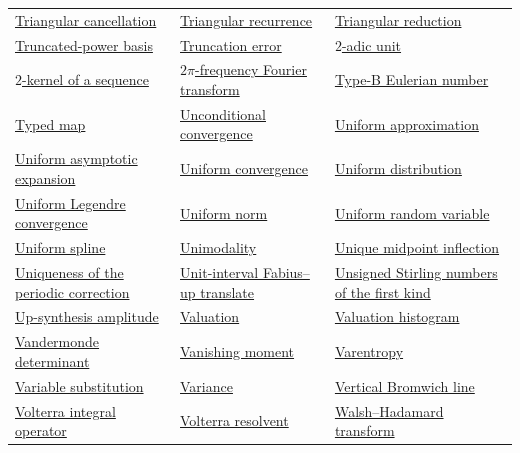 \documentclass[11pt,oneside]{article}
\begin{document}
\begin{longtable}{L{0.31\textwidth}L{0.31\textwidth}L{0.31\textwidth}}
\hyperlink{gls:triangular-cancellation}{Triangular cancellation} & \hyperlink{gls:triangular-recurrence}{Triangular recurrence} & \hyperlink{gls:triangular-reduction}{Triangular reduction} \\
\hyperlink{gls:truncated-power-basis}{Truncated-power basis} & \hyperlink{gls:truncation-error}{Truncation error} & \hyperlink{gls:two-adic-unit}{\(2\)-adic unit} \\
\hyperlink{gls:two-kernel}{\(2\)-kernel of a sequence} & \hyperlink{gls:two-pi-fourier-transform}{\(2\pi\)-frequency Fourier transform} & \hyperlink{gls:type-b-eulerian-number}{Type-B Eulerian number} \\
\hyperlink{gls:typed-map}{Typed map} & \hyperlink{gls:unconditional-convergence}{Unconditional convergence} & \hyperlink{gls:uniform-approximation}{Uniform approximation} \\
\hyperlink{gls:uniform-asymptotic-expansion}{Uniform asymptotic expansion} & \hyperlink{gls:uniform-convergence}{Uniform convergence} & \hyperlink{gls:uniform-distribution}{Uniform distribution} \\
\hyperlink{gls:uniform-legendre-convergence}{Uniform Legendre convergence} & \hyperlink{gls:uniform-norm}{Uniform norm} & \hyperlink{gls:uniform-random-variable}{Uniform random variable} \\
\hyperlink{gls:uniform-spline}{Uniform spline} & \hyperlink{gls:unimodality}{Unimodality} & \hyperlink{gls:unique-midpoint-inflection}{Unique midpoint inflection} \\
\hyperlink{gls:uniqueness-of-periodic-correction}{Uniqueness of the periodic correction} & \hyperlink{gls:fabius-translate-on-unit-interval}{Unit-interval Fabius--up translate} & \hyperlink{gls:unsigned-stirling-first-kind}{Unsigned Stirling numbers of the first kind} \\
\hyperlink{gls:up-synthesis-amplitude}{Up-synthesis amplitude} & \hyperlink{gls:valuation}{Valuation} & \hyperlink{gls:valuation-histogram}{Valuation histogram} \\
\hyperlink{gls:vandermonde-determinant}{Vandermonde determinant} & \hyperlink{gls:vanishing-moment}{Vanishing moment} & \hyperlink{gls:varentropy}{Varentropy} \\
\hyperlink{gls:variable-substitution}{Variable substitution} & \hyperlink{gls:variance}{Variance} & \hyperlink{gls:vertical-bromwich-line}{Vertical Bromwich line} \\
\hyperlink{gls:volterra-operator}{Volterra integral operator} & \hyperlink{gls:volterra-resolvent}{Volterra resolvent} & \hyperlink{gls:walsh-hadamard-transform}{Walsh--Hadamard transform} \\

\end{longtable}
\end{document}
